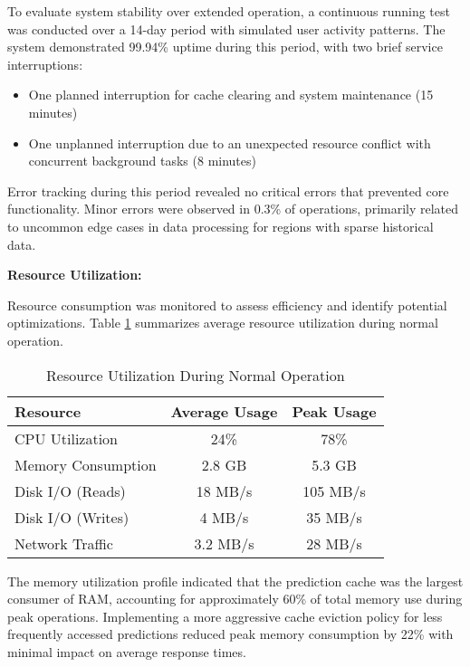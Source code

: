 \documentclass[12pt,a4paper]{report}
\begin{document}
To evaluate system stability over extended operation, a continuous running test was conducted over a 14-day period with simulated user activity patterns. The system demonstrated 99.94\% uptime during this period, with two brief service interruptions:

\begin{itemize}
    \item One planned interruption for cache clearing and system maintenance (15 minutes)
    \item One unplanned interruption due to an unexpected resource conflict with concurrent background tasks (8 minutes)
\end{itemize}

Error tracking during this period revealed no critical errors that prevented core functionality. Minor errors were observed in 0.3\% of operations, primarily related to uncommon edge cases in data processing for regions with sparse historical data.

\textbf{Resource Utilization:}

Resource consumption was monitored to assess efficiency and identify potential optimizations. Table \ref{tab:resource_usage} summarizes average resource utilization during normal operation.

\begin{table}[h]
\centering
\caption{Resource Utilization During Normal Operation}
\label{tab:resource_usage}
\begin{tabular}{@{}lcc@{}}
\toprule
\textbf{Resource} & \textbf{Average Usage} & \textbf{Peak Usage} \\
\midrule
CPU Utilization & 24\% & 78\% \\
Memory Consumption & 2.8 GB & 5.3 GB \\
Disk I/O (Reads) & 18 MB/s & 105 MB/s \\
Disk I/O (Writes) & 4 MB/s & 35 MB/s \\
Network Traffic & 3.2 MB/s & 28 MB/s \\
\bottomrule
\end{tabular}
\end{table}

The memory utilization profile indicated that the prediction cache was the largest consumer of RAM, accounting for approximately 60\% of total memory use during peak operations. Implementing a more aggressive cache eviction policy for less frequently accessed predictions reduced peak memory consumption by 22\% with minimal impact on average response times.
\end{document}
